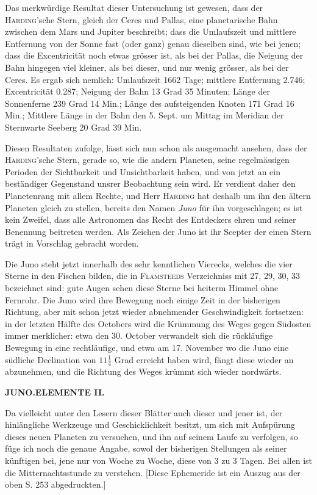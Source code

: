 Das merkwürdige Resultat dieser Untersuchung ist gewesen, dass der \textsc{Harding}'sche Stern,
gleich der Ceres und Pallas, eine planetarische Bahn zwischen dem Mars und Jupiter beschreibt;
dass die Umlaufszeit und mittlere Entfernung von der Sonne fast (oder ganz) genau dieselben sind,
wie bei jenen; dass die Excentricität noch etwas grösser ist, als bei der Pallas, die Neigung
der Bahn hingegen viel kleiner, als bei dieser, und nur wenig grösser, als bei der Ceres. Es
ergab sich nemlich: Umlaufszeit 1662 Tage; mittlere Entfernung 2.746; Excentricität 0.287;
Neigung der Bahn 13 Grad 35 Minuten; Länge der Sonnenferne 239 Grad 14 Min.; Länge des
aufsteigenden Knoten 171 Grad 16 Min.; Mittlere Länge in der Bahn den 5. Sept. um Mittag im
Meridian der Sternwarte Seeberg 20 Grad 39 Min.

Diesen Resultaten zufolge, lässt sich nun schon als ausgemacht ansehen, dass der
\textsc{Harding}'sche Stern, gerade so, wie die andern Planeten, seine regelmässigen Perioden
der Sichtbarkeit und Unsichtbarkeit haben, und von jetzt an ein beständiger Gegenstand unsrer
Beobachtung sein wird. Er verdient daher den Planetenrang mit allem Rechte, und Herr
\textsc{Harding} hat deshalb um ihn den ältern Planeten gleich zu stellen, bereits den Namen
\emph{Juno} für ihn vorgeschlagen; es ist kein Zweifel, dass alle Astronomen das Recht des
Entdeckers ehren und seiner Benennung beitreten werden. Als Zeichen der Juno ist ihr Scepter der
einen Stern trägt in Vorschlag gebracht worden.

Die Juno steht jetzt innerhalb des sehr kenntlichen Vierecks, welches die vier Sterne in den
Fischen bilden, die in \textsc{Flamsteeds} Verzeichniss mit 27, 29, 30, 33 bezeichnet sind: gute
Augen sehen diese Sterne bei heiterm Himmel ohne Fernrohr. Die Juno wird ihre Bewegung noch einige
Zeit in der bisherigen Richtung, aber mit schon jetzt wieder abnehmender Geschwindigkeit
fortsetzen: in der letzten Hälfte des Octobers wird die Krümmung des Weges gegen Südosten
immer merklicher: etwa den 30. October verwandelt sich die rückläufige Bewegung in eine
rechtläufige, und etwa am 17. November wo die Juno eine südliche Declination von
$11\frac{1}{4}$ Grad erreicht haben wird, fängt diese wieder an abzunehmen, und die Richtung des
Weges krümmt sich wieder nordwärts.

\clearpage
\thispagestyle{empty}
\noindent{}%
%
\parbox[t]{\dimexpr\linewidth-24mm\relax}{\centering\footnotesize\bfseries JUNO.\quad ELEMENTE II.\par}%
\makebox[12mm][r]{}\par\nobreak\medskip
\par\indent Da vielleicht unter den Lesern dieser Blätter auch dieser und jener ist, der hinlängliche Werkzeuge und Geschicklichkeit besitzt, um sich mit Aufspürung dieses neuen Planeten zu versuchen, und ihn auf seinem Laufe zu verfolgen, so füge ich noch die genaue Angabe, sowol der bisherigen Stellungen als seiner künftigen bei, jene nur von Woche zu Woche, diese von 3 zu 3 Tagen. Bei allen ist die Mitternachtsstunde zu verstehen. [Diese Ephemeride ist ein Auszug aus der oben S. 253 abgedruckten.]
